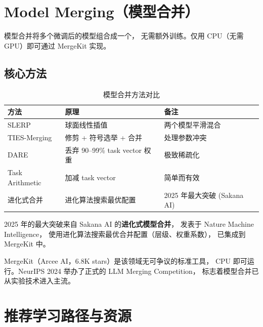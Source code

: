 \documentclass[
  customlatinfont = macos,
]{hkustthesis}
\begin{document}
\chapter{Model Merging（模型合并）}
\label{ch:merging}

模型合并将多个微调后的模型组合成一个，
无需额外训练。仅用 CPU（无需 GPU）即可通过 MergeKit 实现。

\section{核心方法}

\begin{table}[H]
\centering\small
\caption{模型合并方法对比}
\begin{tabularx}{\linewidth}{l l X}
\toprule
\textbf{方法} & \textbf{原理} & \textbf{备注} \\
\midrule
SLERP          & 球面线性插值 & 两个模型平滑混合 \\
TIES-Merging   & 修剪 + 符号选举 + 合并 & 处理参数冲突 \\
DARE           & 丢弃 90--99\% task vector 权重 & 极致稀疏化 \\
Task Arithmetic & 加减 task vector & 简单而有效 \\
进化式合并      & 进化算法搜索最优配置 & 2025 年最大突破 (Sakana AI) \\
\bottomrule
\end{tabularx}
\end{table}

2025 年的最大突破来自 Sakana AI 的\textbf{进化式模型合并}，
发表于 Nature Machine Intelligence，
使用进化算法搜索最优合并配置（层级、权重系数），
已集成到 MergeKit 中。

MergeKit（Arcee AI，6.8K stars）是该领域无可争议的标准工具，
CPU 即可运行。NeurIPS 2024 举办了正式的 LLM Merging Competition，
标志着模型合并已从实验技术进入主流。


\chapter{推荐学习路径与资源}
\label{ch:resources}
\end{document}
